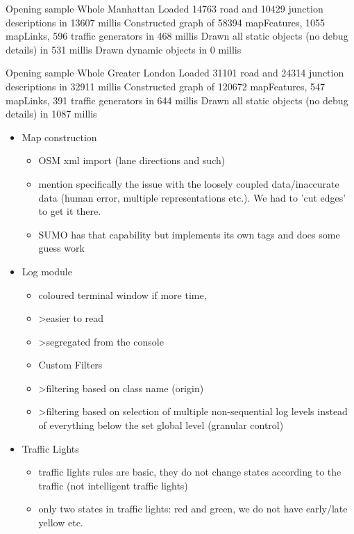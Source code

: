 Opening sample Whole Manhattan
Loaded 14763 road and 10429 junction descriptions in 13607 millis
Constructed graph of 58394 mapFeatures, 1055 mapLinks, 596 traffic generators in 468 millis
Drawn all static objects (no debug details) in 531 millis
Drawn dynamic objects in 0 millis

Opening sample Whole Greater London
Loaded 31101 road and 24314 junction descriptions in 32911 millis
Constructed graph of 120672 mapFeatures, 547 mapLinks, 391 traffic generators in 644 millis
Drawn all static objects (no debug details) in 1087 millis


\begin{itemize}
    \item Map construction
    \begin{itemize}
        \item OSM xml import (lane directions and such)
        \item mention specifically the issue with the loosely coupled data/inaccurate data (human error, multiple representations etc.). We had to 'cut edges' to get it there.
        \item SUMO has that capability but implements its own tags and does some guess work
    \end{itemize}

    \item Log module
    \begin{itemize}
        \item coloured terminal window if more time,
        \item >easier to read
        \item >segregated from the console
        \item Custom Filters
        \item >filtering based on class name (origin)
        \item >filtering based on selection of multiple non-sequential log levels instead of everything below the set global level (granular control)
    \end{itemize}

     \item Traffic Lights
     \begin{itemize}
        \item traffic lights rules are basic, they do not change states according to the traffic (not intelligent traffic lights)
        \item only two states in traffic lights: red and green, we do not have early/late yellow etc. 
     \end{itemize}
\end{itemize}



